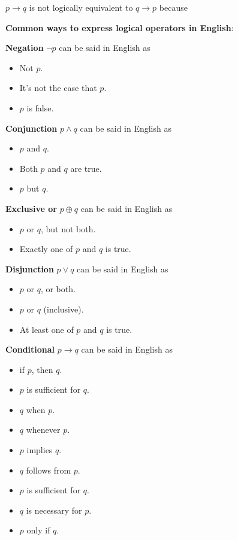 \documentclass[12pt, oneside]{article}
\begin{document}
$p \to q$ is not logically equivalent to $q \to p$ because \underline{\phantom{\hspace{4in}}} 
\vfill
 \newpage


{\bf Common ways to express logical operators in English}:

{\bf Negation} $\lnot p$ can be said in English as 

\vspace{-20pt}
\begin{itemize}
\item Not $p$.
\item It's not the case that $p$.
\item $p$ is false.
\end{itemize}

{\bf Conjunction} $p \land q$ can be said in English as

\vspace{-20pt}
\begin{itemize}
    \item $p$ and $q$.
    \item Both $p$ and $q$ are true.
    \item $p$ but $q$.
\end{itemize}

{\bf Exclusive or} $p \oplus q$ can be said in English as

\vspace{-20pt}
\begin{itemize}
    \item $p$ or $q$, but not both.
    \item Exactly one of $p$ and $q$ is true.
\end{itemize}

{\bf Disjunction} $p \lor q$ can be said in English as

\vspace{-20pt}
\begin{itemize}
    \item $p$ or $q$, or both.
    \item $p$ or $q$ (inclusive).
    \item At least one of $p$ and $q$ is true.
\end{itemize}

{\bf Conditional} $p \to q$ can be said in English as

\begin{multicols}{2}
\begin{itemize}
    \item if $p$, then $q$.
    \item $p$ is sufficient for $q$.
    \item $q$ when $p$.
    \item $q$ whenever $p$.
    \item $p$ implies $q$.
    \item $q$ follows from $p$.
    \item $p$ is sufficient for $q$.
    \item $q$ is necessary for $p$.
    \item $p$ only if $q$.
\end{itemize}
\end{multicols}
\end{document}
